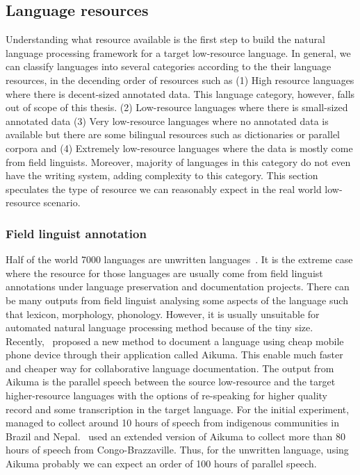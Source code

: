 \documentclass[12pt,twoside,final,hidelinks]{ltthesis}
\theoremstyle{definition}
\begin{document}
\subsection{Language resources}
Understanding what resource available is the first step to build the natural language processing framework for a target 
low-resource language. In general, we can classify languages into several categories according to the their language resources, in the  decending order of resources such as (1) High resource languages where there is decent-sized annotated data. This language category, however, falls out of scope of this thesis. (2) Low-resource languages where there is small-sized annotated data (3) Very low-resource languages where no annotated data is available but there are some bilingual resources such as dictionaries or parallel corpora and (4) Extremely low-resource languages where the data is mostly come from field linguists. Moreover, majority of languages in this category do not even have the writing system, adding complexity to this category. 
This section speculates the type of resource we can reasonably expect in the real world low-resource scenario. 
\subsubsection{Field linguist annotation}
Half of the world 7000 languages are unwritten languages~\cite{lewis2009}. It is the 
extreme case where the resource for those languages are usually come from field 
linguist annotations under language preservation and documentation projects. There can 
be many outputs from field linguist analysing some aspects of the language such that 
lexicon, morphology, phonology. However, it is usually unsuitable for 
automated natural language processing method because of the tiny size. 
Recently,~ proposed a new method to document a language using cheap mobile phone device through their application called 
Aikuma. This enable much faster and cheaper way for collaborative language documentation. The output from Aikuma is the parallel speech between the source low-resource and the target higher-resource 
languages with the options of re-speaking for higher quality record and some 
transcription in the target language. For the initial experiment,~ managed to collect around 10 hours of speech from indigenous 
communities in Brazil and Nepal.~ used an extended version of Aikuma to collect more than 80 hours of speech from Congo-Brazzaville. Thus, for the unwritten language, using Aikuma probably we can expect an order of 100 hours of parallel speech. 
\end{document}
